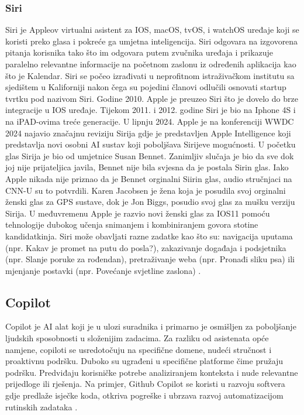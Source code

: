\documentclass[]{foi}
\begin{document}
\subsubsection{Siri}

Siri je Appleov virtualni asistent za IOS, macOS, tvOS, i watchOS uređaje koji se koristi preko glasa i pokreće ga umjetna inteligencija. Siri odgovara na izgovorena pitanja korisnika
tako što im odgovara putem zvučnika uređaja i prikazuje paralelno relevantne informacije na početnom zaslonu iz određenih aplikacija kao što je Kalendar. Siri se počeo izrađivati
u neprofitnom istraživačkom institutu sa sjedištem u Kaliforniji nakon čega su pojedini članovi odlučili osnovati startup tvrtku pod nazivom Siri. Godine 2010. Apple je preuzeo Siri što
je dovelo do brze integracije u IOS uređaje. Tijekom 2011. i 2012. godine Siri je bio na Iphone 4S i na iPAD-ovima treće generacije. U lipnju 2024. Apple je na konferenciji WWDC 2024 najavio značajnu
reviziju Sirija gdje je predstavljen Apple Intelligence koji predstavlja novi osobni AI sustav koji poboljšava Sirijeve mogućnosti. U početku glas Sirija je bio od umjetnice Susan Bennet. Zanimljiv slučaja
je bio da sve dok joj nije prijateljica javila, Bennet nije bila svjesna da je postala Sirin glas. Iako Apple nikada nije priznao da je Bennet orginalni Siirin glas, audio stručnjaci na CNN-U
su to potvrdili. Karen Jacobsen je žena koja je posudila svoj orginalni ženski glas za GPS sustave, dok je Jon Biggs, posudio svoj glas za mušku verziju Sirija. U međuvremenu Apple je razvio novi ženski glas za IOS11
pomoću tehnologije dubokog učenja snimanjem i kombiniranjem govora stotine kandidatkinja. Siri može obavljati razne zadatke kao što su: navigacija uputama (npr. Kakav je promet na putu do posla?),
zakazivanje događaja i podsjetnika (npr. Slanje poruke za rođendan), pretraživanje weba (npr. Pronađi sliku psa) ili mjenjanje postavki (npr. Povećanje svjetline zaslona) \cite{mixon_siri_2025}.

\subsection{Copilot}

Copilot je AI alat koji je u ulozi suradnika i primarno je osmišljen za poboljšanje ljudskih sposobnosti u složenijim zadacima. Za razliku od asistenata opće namjene, copiloti se usredotočuju na specifične domene,
nudeći stručnost i proaktivnu podršku. Duboko su ugrađeni u specifične platforme čime pružaju podršku. Predviđaju korisničke potrebe analiziranjem konteksta i nude relevantne prijedloge ili rješenja.
Na primjer, Github Copilot se koristi u razvoju softvera gdje predlaže isječke koda, otkriva pogreške i ubrzava razvoj automatizacijom rutinskih zadataka \cite{exomindset2025difference}.
\end{document}
